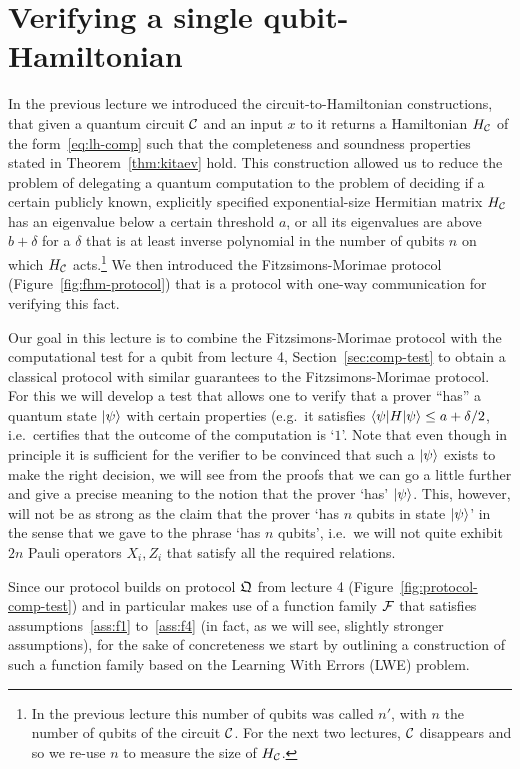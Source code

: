 \chapter{Verifying a single qubit-Hamiltonian}

In the previous lecture we introduced the circuit-to-Hamiltonian constructions, that given a quantum circuit $\mathcal{C}$ and an input $x$ to it returns a Hamiltonian $H_{\mathcal{C}}$ of the form~\eqref{eq:lh-comp} such that the completeness and soundness properties stated in Theorem~\ref{thm:kitaev} hold. This construction allowed us to reduce the problem of delegating a quantum computation to the problem of deciding if a certain publicly known, explicitly specified exponential-size Hermitian matrix $H_{\mathcal{C}}$ has an eigenvalue below a certain threshold $a$, or all its eigenvalues are above $b+\delta$ for a $\delta$ that is at least inverse polynomial in the number of qubits $n$ on which $H_{\mathcal{C}}$ acts.\footnote{In the previous lecture this number of qubits was called $n'$, with $n$ the number of qubits of the circuit $\mathcal{C}$. For the next two lectures, $\mathcal{C}$ disappears and so we re-use $n$ to measure the size of $H_{\mathcal{C}}$.} We then introduced the Fitzsimons-Morimae protocol (Figure~\ref{fig:fhm-protocol}) that is a protocol with one-way communication for verifying this fact. 

Our goal in this lecture is to combine the Fitzsimons-Morimae protocol with the computational test for a qubit from lecture 4, Section~\ref{sec:comp-test} to obtain a classical protocol with similar guarantees to the Fitzsimons-Morimae protocol. For this we will develop a test that allows one to verify that a prover ``has'' a quantum state $|\psi\rangle$ with certain properties (e.g.\ it satisfies $\langle\psi|H|\psi\rangle \leq a + \delta/2$, i.e.\ certifies that the outcome of the computation is `$1$'. Note that even though in principle it is sufficient for the verifier to be convinced  that such a $|\psi\rangle$ exists to make the right decision, we will see from the proofs that we can go a little further and give a precise meaning to the notion that the prover `has' $|\psi\rangle$. This, however, will not be as strong as the claim that the prover `has $n$ qubits in state $|\psi\rangle$' in the sense that we gave to the phrase `has $n$ qubits', i.e.\ we will not quite exhibit $2n$ Pauli operators $X_i,Z_i$ that satisfy all the required relations. 

Since our protocol builds on protocol $\mathfrak{Q}$ from lecture 4 (Figure~\ref{fig:protocol-comp-test}) and in particular makes use of a function family $\mathcal{F}$ that satisfies assumptions~\ref{ass:f1} to~\ref{ass:f4} (in fact, as we will see, slightly stronger assumptions), for the sake of concreteness we start by outlining a construction of such a function family based on the Learning With Errors (LWE) problem. 

